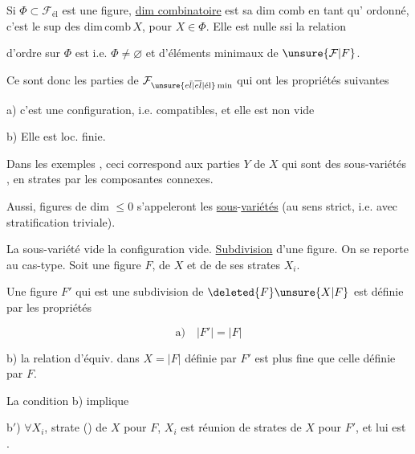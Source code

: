 Si $\Phi\subset\mathcal{F}_{\text{él}}$ est une figure,  \uline{dim combinatoire} est sa dim comb en tant qu' ordonné, c'est  le sup des $\mathrm{dim\,comb}\,X$, pour $X\in\Phi$. Elle est nulle ssi   la relation

d'ordre sur $\Phi$ est  i.e. $\Phi\neq\varnothing$ et  d'éléments minimaux de $\unsure{\mathcal{F}|F}$.

Ce sont donc les  parties de $\mathcal{F}_{\unsure{e\bar l|\overline{el}|\text{él}}\,\mathrm{min}}$ qui ont les propriétés suivantes

a) c'est une configuration, i.e.    compatibles, et elle est non vide

b) Elle est loc. finie.

Dans les exemples , ceci correspond aux parties  $Y$ de $X$ qui sont des sous-variétés ,  en strates par les composantes connexes.

Aussi,  figures de dim $\leq 0$ s'appeleront les \uline{sous}-\uline{variétés} (au sens strict, i.e. avec stratification triviale).

La sous-variété vide   la configuration vide.
\uline{Subdivision} d'une figure.  On se reporte au cas-type. Soit une figure $F$,  de $X$ et de  de ses strates $X_i$.

Une  figure $F'$ qui est une subdivision de $\deleted{F}\unsure{X|F}$ est  définie par les propriétés

\[
\text{a)}\quad |F'|=|F|
\]

b) la relation d'équiv. dans $X=|F|$ définie par $F'$ est plus fine que celle définie par  $F$.

La condition b) implique

b$'$) $\forall X_i$, strate () de $X$ pour $F$, $X_i$ est réunion de strates de $X$ pour $F'$,  et  lui est  .

